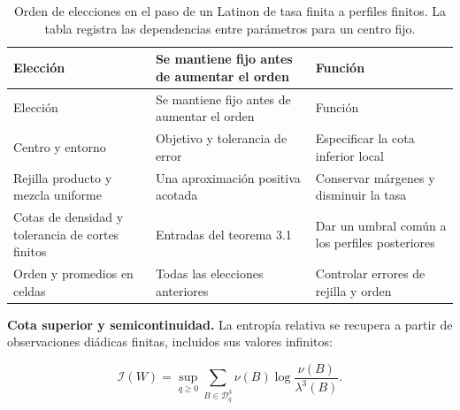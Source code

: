 \documentclass[spanish,11pt,a4paper]{article}
\begin{document}
\begin{longtable}[]{@{}
  >{\raggedright\arraybackslash}p{}
  >{\raggedright\arraybackslash}p{}
  >{\raggedright\arraybackslash}p{}@{}}
\caption{Orden de elecciones en el paso de un Latinon de tasa finita a perfiles finitos. La tabla registra las dependencias entre parámetros para un centro fijo.}\tabularnewline
\toprule\noalign{}
\begin{minipage}[b]{\linewidth}\raggedright
Elección
\end{minipage} & \begin{minipage}[b]{\linewidth}\raggedright
Se mantiene fijo antes de aumentar el orden
\end{minipage} & \begin{minipage}[b]{\linewidth}\raggedright
Función
\end{minipage} \\
\midrule\noalign{}
\endfirsthead
\toprule\noalign{}
\begin{minipage}[b]{\linewidth}\raggedright
Elección
\end{minipage} & \begin{minipage}[b]{\linewidth}\raggedright
Se mantiene fijo antes de aumentar el orden
\end{minipage} & \begin{minipage}[b]{\linewidth}\raggedright
Función
\end{minipage} \\
\midrule\noalign{}
\endhead
\bottomrule\noalign{}
\endlastfoot
Centro y entorno & Objetivo y tolerancia de error & Especificar la cota inferior local \\
Rejilla producto y mezcla uniforme & Una aproximación positiva acotada & Conservar márgenes y disminuir la tasa \\
Cotas de densidad y tolerancia de cortes finitos & Entradas del teorema 3.1 & Dar un umbral común a los perfiles posteriores \\
Orden y promedios en celdas & Todas las elecciones anteriores & Controlar errores de rejilla y orden \\
\end{longtable}

\textbf{Cota superior y semicontinuidad.} La entropía relativa se recupera a partir de observaciones diádicas finitas, incluidos sus valores infinitos:

\nopagebreak[4]
\[\mathcal I(W)=\sup_{q\ge0}\sum_{B\in\mathcal D_q^3}
\nu(B)\log\frac{\nu(B)}{\lambda^3(B)}.\tag{8.1}\]
\end{document}
